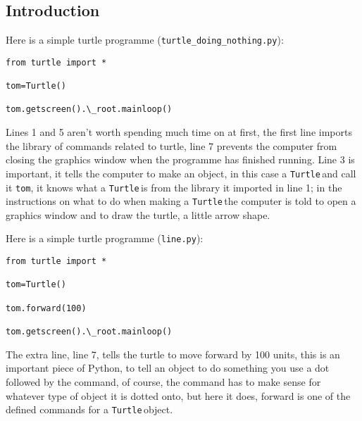 \documentclass[11pt,a4paper]{scrartcl}
\newcommand{\turtle}{\texttt{Turtle}\,}
\begin{document}
\subsection*{Introduction}
Here is a simple turtle programme (\texttt{turtle\_doing\_nothing.py}):
\begin{lstlisting}[numbers=right]
from turtle import *

tom=Turtle()

tom.getscreen().\_root.mainloop()
\end{lstlisting}
Lines 1 and 5 aren't worth spending much time on at first, the first
line imports the library of commands related to turtle, line 7
prevents the computer from closing the graphics window when the
programme has finished running. Line 3 is important, it tells the
computer to make an object, in this case a \turtle and call it
\texttt{tom}, it knows what a \turtle is from the library it
imported in line 1; in the instructions on what to do when making a \turtle the computer is told to open a graphics window and to draw the turtle,  a little arrow shape.

Here is a simple turtle programme (\texttt{line.py}):
\begin{lstlisting}[numbers=right]
from turtle import *

tom=Turtle()

tom.forward(100)

tom.getscreen().\_root.mainloop()
\end{lstlisting}
The extra line, line 7, tells the turtle to move forward by 100 units, this is an important piece of Python, to tell an object to do something you use a dot followed by the command, of course, the command has to make sense for whatever type of object it is dotted onto, but here it does, forward is one of the defined commands for a \turtle object. 
\end{document}

